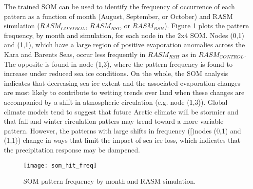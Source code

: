 The trained SOM can be used to identify the frequency of occurrence of each pattern as a function of month (August, September, or October) and RASM simulation ($RASM_{CONTROL}$, $RASM_{RSI}$, or $RASM_{RSH}$).
Figure \ref{fig:som_hit_freq} plots the pattern frequency, by month and simulation, for each node in the 2x4 SOM.
Nodes (0,1) and (1,1), which have a large region of positive evaporation anomalies across the Kara and Barents Seas, occur less frequently in $RASM_{RSH}$ as in $RASM_{CONTROL}$.
The opposite is found in node (1,3), where the pattern frequency is found to increase under reduced sea ice conditions.
On the whole, the SOM analysis indicates that decreasing sea ice extent and the associated evaporation changes are most likely to contribute to wetting trends over land when these changes are accompanied by a shift in atmospheric circulation (e.g. node (1,3)).
Global climate models tend to suggest that future Arctic climate will be stormier \citep{Vavrus_2012} and that fall and winter circulation patters may trend toward a more variable pattern.
However, the patterns with large shifts in frequency ([)nodes (0,1) and (1,1)) change in ways that limit the impact of sea ice loss, which indicates that the precipitation response may be dampened.

\begin{figure}
  \centering
  \texttt{[image: som\_hit\_freq]}
  \caption{SOM pattern frequency by month and RASM simulation.} %

  \label{fig:som_hit_freq}
\end{figure}


